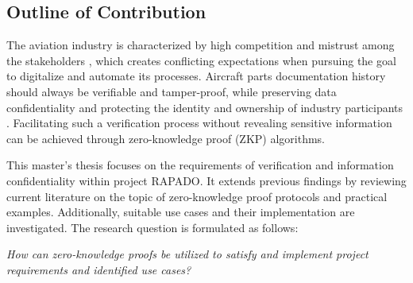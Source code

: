 \subsection{Outline of Contribution}
The aviation industry is characterized by high competition and mistrust among the stakeholders \citep{Chatzi2019TDoC}, which creates conflicting expectations when pursuing the goal to digitalize and automate its processes. Aircraft parts documentation history should always be verifiable and tamper-proof, while preserving data confidentiality and protecting the identity and ownership of industry participants \citep{Wickboldt2019BlockchainFW}. Facilitating such a verification process without revealing sensitive information can be achieved through zero-knowledge proof (ZKP) algorithms.

This master's thesis focuses on the requirements of verification and information confidentiality within project RAPADO. It extends previous findings by reviewing current literature on the topic of zero-knowledge proof protocols and practical examples. Additionally, suitable use cases and their implementation are investigated. The research question is formulated as follows:

\textit{How can zero-knowledge proofs be utilized to satisfy and implement project requirements and identified use cases?} 

